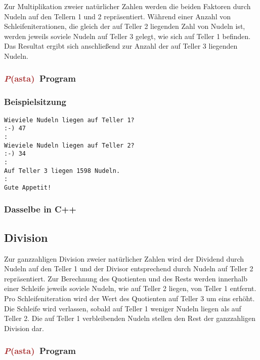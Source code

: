 \documentclass[11pt]{book}
\newcommand{\Pasta}{\textcolor{brown}{{\bf \em P}{\scriptsize{(asta)}}}}
\begin{document}
Zur Multiplikation zweier nat\"urlicher Zahlen werden die beiden 
Faktoren
durch Nudeln auf den Tellern 1 und 2 repr\"asentiert. W\"ahrend
einer Anzahl von Schleifeniterationen, die gleich der auf Teller 2
liegenden Zahl von Nudeln ist, werden jeweils soviele Nudeln auf Teller
3 gelegt, wie sich auf Teller 1 befinden. Das Resultat ergibt sich
anschlie\ss end zur Anzahl der auf Teller 3 liegenden Nudeln.

\subsubsection{\Pasta\ Program}
\color{blue}

\color{black}

\subsubsection{Beispielsitzung}
\color{purple}
\begin{lstlisting}
Wieviele Nudeln liegen auf Teller 1?
:-) 47      
:
Wieviele Nudeln liegen auf Teller 2?
:-) 34
:
Auf Teller 3 liegen 1598 Nudeln.
:
Gute Appetit!
\end{lstlisting}
\color{black}

\subsubsection{Dasselbe in C++}



\subsection{Division}

Zur ganzzahligen Division zweier nat\"urlicher Zahlen wird der Dividend
durch Nudeln auf den Teller 1 und der Divisor entsprechend durch 
Nudeln auf Teller 2 repr\"asentiert. Zur Berechnung des Quotienten und 
des Rests werden innerhalb einer Schleife jeweils soviele Nudeln, wie
auf Teller 2 liegen, von Teller 1 entfernt. Pro Schleifeniteration wird
der Wert des Quotienten auf Teller 3 um eins erh\"oht. Die Schleife
wird verlassen, sobald auf Teller 1 weniger Nudeln liegen als auf
Teller 2. Die auf Teller 1 verbleibenden Nudeln stellen den
Rest der ganzzahligen Division dar.

\subsubsection{\Pasta\ Program}
\color{blue}

\color{black}
\end{document}
